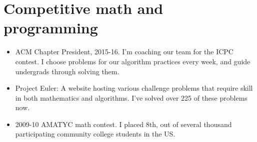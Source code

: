 \documentclass[a4paper,10pt]{article} %
\begin{document}
\section{Competitive math and programming}

\begin{itemize}
\item ACM Chapter President, 2015-16. I'm coaching our team for the ICPC contest. I choose problems for our algorithm practices every week, and guide undergrads through solving them.
\item Project Euler: A website hosting various challenge problems that require skill in both mathematics and algorithms. I've solved over 225 of these problems now.
\item 2009-10 AMATYC math contest. I placed 8th, out of several thousand participating community college students in the US.
\end{itemize}


%
%
\end{document}
